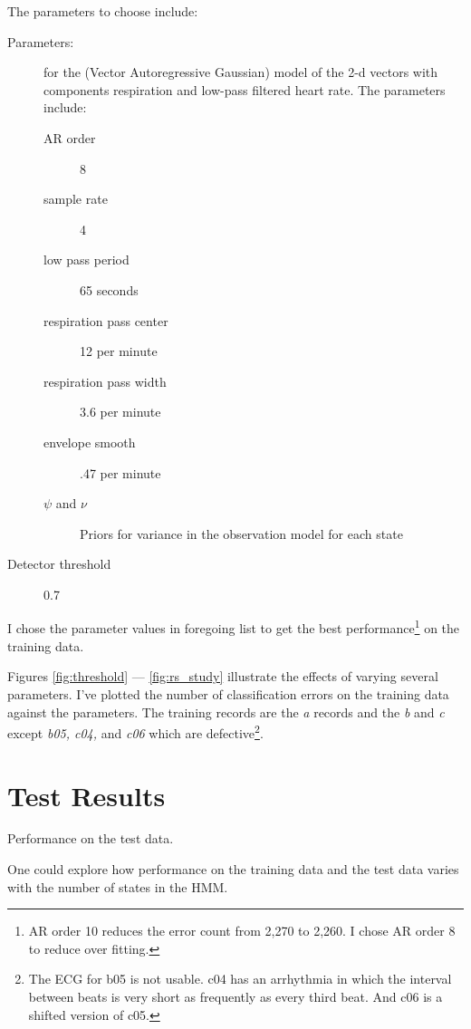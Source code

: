 \documentclass[12pt]{article}
\begin{document}
The parameters to choose include:
\begin{description}
\item[Parameters:] for the (Vector Autoregressive Gaussian) model
  of the 2-d vectors with components respiration and low-pass filtered
  heart rate.  The parameters include:
  \begin{description}
  \item[AR order] 8 %
  \item[sample rate] 4 %
  \item[low pass period] 65 seconds %
  \item[respiration pass center] 12 per minute %
  \item[respiration pass width] 3.6 per minute %
  \item[envelope smooth] .47 per minute %
  \item[$\psi$ and $\nu$] Priors for variance in the observation model
    for each state
  \end{description}
\item[Detector threshold] 0.7 %
\end{description}
I chose the parameter values in foregoing list to get the best
performance\footnote{AR order 10 reduces the error count from 2,270 to
  2,260.  I chose AR order 8 to reduce over fitting.} on the training
data.

Figures \ref{fig:threshold} --- \ref{fig:rs_study}
illustrate the effects of varying several parameters.  I've plotted
the number of classification errors on the training data against the
parameters.  The training records are the \emph{a} records and the
\emph{b} and \emph{c} except \emph{b05, c04,} and \emph{c06} which are
defective\footnote{The ECG for b05 is not usable.  c04 has an
  arrhythmia in which the interval between beats is very short as
  frequently as every third beat.  And c06 is a shifted version of
  c05.}.


\section{Test Results}
\label{sec:results}

\begin{table*}
  \centering
  
  \caption[Performance]{Performance on the test data.}
  \label{tab:test_score}
\end{table*}

One could explore how performance on the training data and the test
data varies with the number of states in the HMM.
\end{document}
